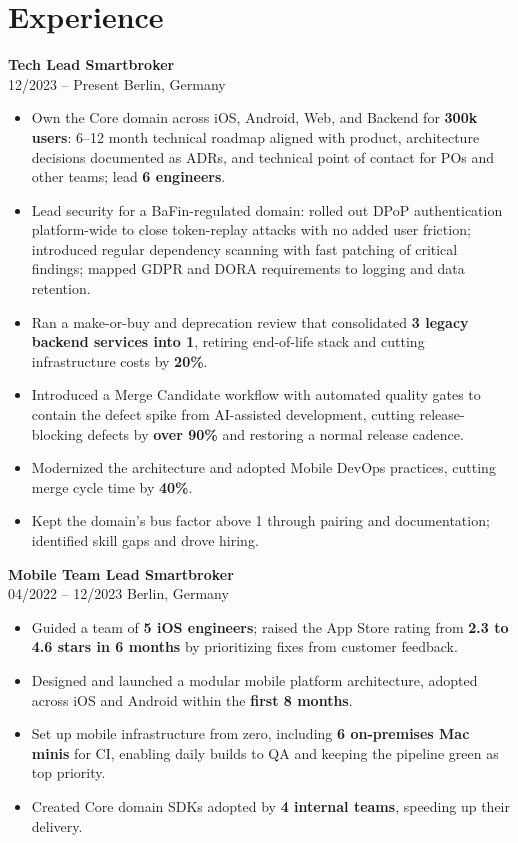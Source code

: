 \documentclass[10pt,a4paper]{article}
\newcommand{\expitem}[4]{%
  \vspace{2pt}%
  {\normalsize\bfseries\color{darktext}#1 \textbullet{} \color{accent}#2}\\[1pt]%
  {\small\color{muted}#3 \textbullet{} #4}%
  \par\vspace{3pt}%
}
\begin{document}
\section{Experience}

\expitem{Tech Lead}{Smartbroker}{12/2023 -- Present}{Berlin, Germany}
\begin{itemize}
  \item Own the Core domain across iOS, Android, Web, and Backend for \textbf{300k users}: 6--12 month technical roadmap aligned with product, architecture decisions documented as ADRs, and technical point of contact for POs and other teams; lead \textbf{6 engineers}.
  \item Lead security for a BaFin-regulated domain: rolled out DPoP authentication platform-wide to close token-replay attacks with no added user friction; introduced regular dependency scanning with fast patching of critical findings; mapped GDPR and DORA requirements to logging and data retention.
  \item Ran a make-or-buy and deprecation review that consolidated \textbf{3 legacy backend services into 1}, retiring end-of-life stack and cutting infrastructure costs by \textbf{20\%}.
  \item Introduced a Merge Candidate workflow with automated quality gates to contain the defect spike from AI-assisted development, cutting release-blocking defects by \textbf{over 90\%} and restoring a normal release cadence.
  \item Modernized the architecture and adopted Mobile DevOps practices, cutting merge cycle time by \textbf{40\%}.
  \item Kept the domain's bus factor above 1 through pairing and documentation; identified skill gaps and drove hiring.
\end{itemize}

\expitem{Mobile Team Lead}{Smartbroker}{04/2022 -- 12/2023}{Berlin, Germany}
\begin{itemize}
  \item Guided a team of \textbf{5 iOS engineers}; raised the App Store rating from \textbf{2.3 to 4.6 stars in 6 months} by prioritizing fixes from customer feedback.
  \item Designed and launched a modular mobile platform architecture, adopted across iOS and Android within the \textbf{first 8 months}.
  \item Set up mobile infrastructure from zero, including \textbf{6 on-premises Mac minis} for CI, enabling daily builds to QA and keeping the pipeline green as top priority.
  \item Created Core domain SDKs adopted by \textbf{4 internal teams}, speeding up their delivery.
\end{itemize}
\end{document}
